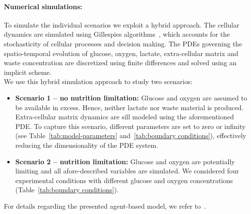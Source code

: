 \documentclass[10pt,letterpaper]{article}
\begin{document}
\paragraph{Numerical simulations:}
To simulate the individual scenarios we exploit a hybrid approach. The cellular dynamics are simulated using Gillespies algorithms~\cite{Gillespie1977}, which accounts for the stochasticity of cellular processes and decision making. The PDEs governing the spatio-temporal evolution of glucose, oxygen, lactate, extra-cellular matrix and waste concentration are discretized using finite differences and solved using an implicit scheme.
\\[1ex]
\noindent We use this hybrid simulation approach to study two scenarios:
\begin{itemize}
%
\item \textbf{Scenario 1 -- no nutrition limitation:} Glucose and oxygen are assumed to be available in excess. Hence, neither lactate nor waste material is produced. Extra-cellular matrix dynamics are sill modeled using the aforementioned PDE. To capture this scenario, different parameters are set to zero or infinity (see Table~\ref{tab:model-parameters} and~\ref{tab:boundary conditions}), effectively reducing the dimensionality of the PDE system.
%
\item \textbf{Scenario 2 -- nutrition limitation:} Glucose and oxygen are potentially limiting and all afore-described variables are simulated. We considered four experimental conditions with different glucose and oxygen concentrations (Table~\ref{tab:boundary conditions}). 
\end{itemize}
For details regarding the presented agent-based model, we refer to~\cite{Jagiella2012}.
\end{document}
